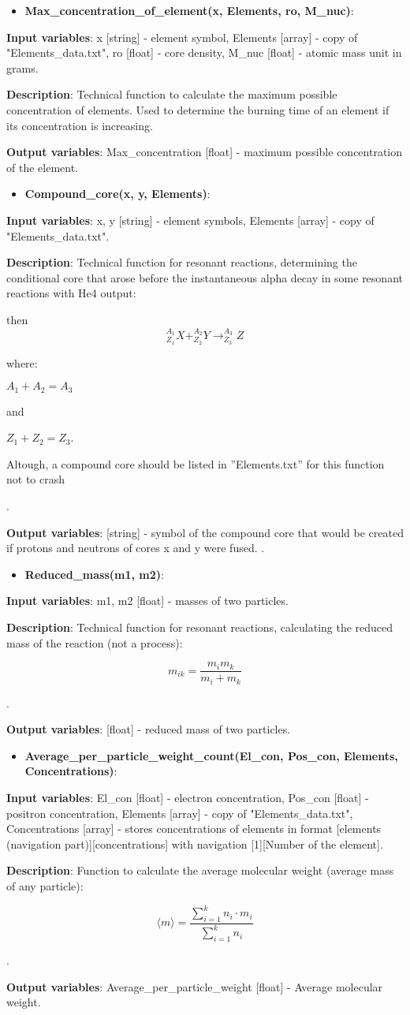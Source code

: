 \documentclass[a4paper,12pt]{article}
\newcommand{\namefunction}[4]{
  \begin{itemize}
    \item \textbf{#1}:
  \end{itemize}
  
  \textbf{Input variables}: #2.
  
  \textbf{Description}: #3.
  
  \textbf{Output variables}: #4.
}
\begin{document}
\vspace{1em}

\namefunction{Max\_concentration\_of\_element(x, Elements, ro, M\_nuc)}{x [string] - element symbol, Elements [array] - copy of "Elements\_data.txt", ro [float] - core density, M\_nuc [float] - atomic mass unit in grams}{Technical function to calculate the maximum possible concentration of elements. Used to determine the burning time of an element if its concentration is increasing}{Max\_concentration [float] - maximum possible concentration of the element}

\vspace{1em}

\namefunction{Compound\_core(x, y, Elements)}{x, y [string] - element symbols, Elements [array] - copy of "Elements\_data.txt"}{Technical function for resonant reactions, determining the conditional core that arose before the instantaneous alpha decay in some resonant reactions with He4 output:

then \[^{A_{1}}_{Z_{1}}X + ^{A_{2}}_{Z_{2}}Y \rightarrow ^{A_{3}}_{Z_{3}}Z\]

where:

$A_{1} + A_{2} = A_{3}$

and 

$Z_{1} + Z_{2} = Z_{3}$.

Altough, a compound core should be listed in ''Elements.txt'' for this function not to crash

}{[string] - symbol of the compound core that would be created if protons and neutrons of cores x and y were fused}.

\vspace{1em}

\namefunction{Reduced\_mass(m1, m2)}{m1, m2 [float] - masses of two particles}{Technical function for resonant reactions, calculating the reduced mass of the reaction (not a process):

\[m_{ik} = \frac{m_i m_k}{m_i + m_k}\]

}{[float] - reduced mass of two particles}

\vspace{1em}

\namefunction{Average\_per\_particle\_weight\_count(El\_con, Pos\_con, Elements, Concentrations)}{El\_con [float] - electron concentration, Pos\_con [float] - positron concentration, Elements [array] - copy of "Elements\_data.txt", Concentrations [array] - stores concentrations of elements in format [elements (navigation part)][concentrations] with navigation [1][Number of the element]}{Function to calculate the average molecular weight (average mass of any particle):

\[\langle m \rangle = \frac{\sum_{i = 1}^{k} n_i \cdot m_i}{\sum_{i = 1}^{k} n_i}\]

}{Average\_per\_particle\_weight [float] - Average molecular weight}
\end{document}
